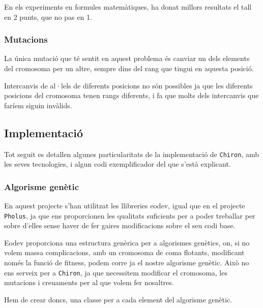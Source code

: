 En els experiments en formules matemàtiques, ha donat millors resultats el tall
en 2 punts, que no pas en 1.


\subsubsection{Mutacions} %
\label{ssub:Mutacions}

La única mutació que té sentit en aquest problema és canviar un dels elements
del cromosoma per un altre, sempre dins del rang que tingui en aquesta posició.

Intercanvis de al·lels de diferents posicions no són possibles ja que les
diferents posicions del cromosoma tenen rangs diferents, i fa que molts dels
intercanvis que faríem siguin invàlids.


\subsection{Implementació} %
	\label{sub:Implementacio}

Tot seguit es detallen algunes particularitats de la implementació de
\texttt{Chiron}, amb les seves tecnologies, i algun codi exemplificador del que
s'està explicant.

\subsubsection{Algorisme genètic} %
\label{ssub:algorisme genetic}

En aquest projecte s'han utilitzat les llibreries eodev, igual que en el
projecte \texttt{Pholus}, ja que ens proporcionen les qualitats suficients per a
poder treballar per sobre d'elles sense haver de fer gaires modificacions sobre
el seu codi base.

Eodev proporciona una estructura genèrica per a algorismes genètics, on, si no
volem massa complicacions, amb un cromosoma de coma flotants, modificant només
la funció de fitness, podem corre ja el nostre algorisme genètic.  Això no ens
serveix per a \texttt{Chiron}, ja que necessitem modificar el cromosoma, les
mutacions i creuaments per al que volem fer nosaltres.

Hem de crear doncs, una classe per a cada element del algorisme genètic.



